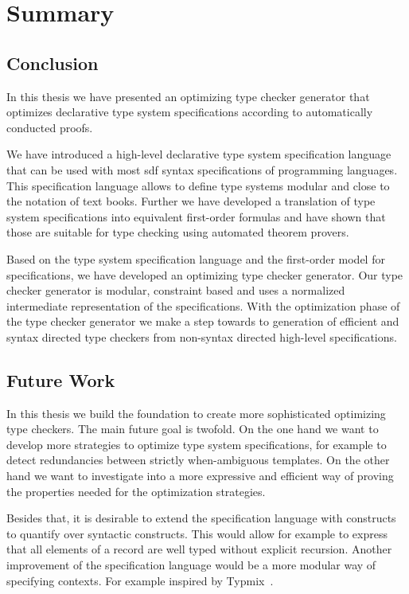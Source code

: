 \chapter{Summary}
\label{cha:summary}
\section{Conclusion}
In this thesis we have presented an optimizing type checker generator
that optimizes declarative type system specifications according to
automatically conducted proofs.

We have introduced a high-level declarative type system specification
language that can be used with most \gls{sdf} syntax specifications of
programming languages. This specification language allows to define
type systems modular and close to the notation of text books. Further
we have developed a translation of type system specifications into
equivalent first-order formulas and have shown that those are suitable
for type checking using automated theorem provers.

Based on the type system specification language and the first-order
model for specifications, we have developed an optimizing type checker
generator. Our type checker generator is modular, constraint based and
uses a normalized intermediate representation of the
specifications. With the optimization phase of the type checker
generator we make a step towards to generation of efficient and syntax
directed type checkers from non-syntax directed high-level
specifications.

\section{Future Work}
In this thesis we build the foundation to create more sophisticated
optimizing type checkers. The main future goal is twofold. On the one
hand we want to develop more strategies to optimize type system
specifications, for example to detect redundancies between strictly
when-ambiguous templates. On the other hand we want to investigate
into a more expressive and efficient way of proving the properties
needed for the optimization strategies.

Besides that, it is desirable to extend the specification language
with constructs to quantify over syntactic constructs. This would
allow for example to express that all elements of a record are well
typed without explicit recursion. Another improvement of the
specification language would be a more modular way of specifying
contexts. For example inspired by Typmix~\cite{bergan2007typmix}.

